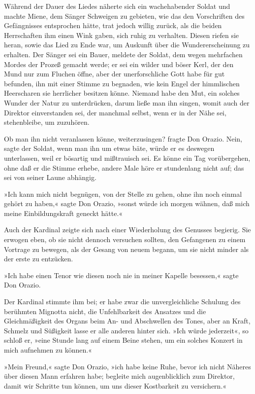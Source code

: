 \pagenum{[66]}Während der Dauer des Liedes näherte sich ein
wachehabender Soldat und machte Miene, dem Sänger Schweigen zu
gebieten, wie das den Vorschriften des Gefängnisses entsprochen
hätte, trat jedoch willig zurück, als die beiden Herrschaften ihm
einen Wink gaben, sich ruhig zu verhalten. Diesen riefen sie heran,
sowie das Lied zu Ende war, um Auskunft über die Wundererscheinung
zu erhalten. Der Sänger sei ein Bauer, meldete der Soldat, dem
wegen mehrfachen Mordes der Prozeß gemacht werde; er sei ein wilder
und böser Kerl, der den Mund nur zum Fluchen öffne, aber der
unerforschliche Gott habe für gut befunden, ihn mit einer Stimme zu
begnaden, wie kein Engel der himmlischen Heerscharen sie herrlicher
besitzen könne. Niemand habe den Mut, ein solches Wunder der Natur
zu unterdrücken, darum ließe man ihn singen, womit auch der
Direktor einverstanden sei, der manchmal selbst, wenn er in der
Nähe sei, stehenbleibe, um zuzuhören.

Ob man ihn nicht veranlassen könne, weiterzusingen? fragte Don
Orazio. Nein, sagte der Soldat, wenn man ihn um etwas bäte, würde
er es deswegen unterlassen, weil er bösartig und mißtrauisch sei.
Es könne ein Tag vorübergehen, ohne daß er die Stimme erhebe,
andere Male höre er stundenlang nicht auf; das sei von seiner Laune
abhängig.

»Ich kann mich nicht begnügen, von der Stelle zu gehen, ohne ihn
noch einmal gehört zu haben,« sagte Don Orazio, »sonst würde ich
morgen wähnen, daß mich meine Einbildungskraft geneckt hätte.«

Auch der Kardinal zeigte sich nach einer Wiederholung des Genusses
begierig. Sie erwogen eben, ob sie nicht dennoch versuchen sollten,
den Gefangenen zu einem Vortrage zu bewegen, als der Gesang von
neuem begann, um sie nicht minder als der erste zu entzücken.

\pagenum{[67]}»Ich habe einen Tenor wie diesen noch nie in meiner
Kapelle besessen,« sagte Don Orazio.

Der Kardinal stimmte ihm bei; er habe zwar die unvergleichliche
Schulung des berühmten Mignotta nicht, die Unfehlbarkeit des
Ansatzes und die Gleichmäßigkeit des Organs beim An- und
Abschwellen des Tones, aber an Kraft, Schmelz und Süßigkeit lasse
er alle anderen hinter sich. »Ich würde jederzeit«, so schloß er,
»eine Stunde lang auf einem Beine stehen, um ein solches Konzert in
mich aufnehmen zu können.«

»Mein Freund,« sagte Don Orazio, »ich habe keine Ruhe, bevor ich
nicht Näheres über diesen Mann erfahren habe; begleite mich
augenblicklich zum Direktor, damit wir Schritte tun können, um uns
dieser Kostbarkeit zu versichern.«

